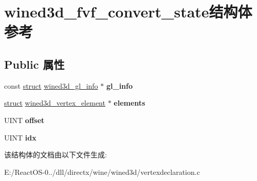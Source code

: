 \hypertarget{structwined3d__fvf__convert__state}{}\section{wined3d\+\_\+fvf\+\_\+convert\+\_\+state结构体 参考}
\label{structwined3d__fvf__convert__state}
\subsection*{Public 属性}
\begin{DoxyCompactItemize}
\item 
\mbox{\label{structwined3d__fvf__convert__state_a5e840e91ea45bf5d2d4d77de8e60e11f}} 
const \hyperlink{interfacestruct}{struct} \hyperlink{structwined3d__gl__info}{wined3d\+\_\+gl\+\_\+info} $\ast$ {\bfseries gl\+\_\+info}
\item 
\mbox{\label{structwined3d__fvf__convert__state_a74fcb92bd3f340d1e07d19ba9ffad237}} 
\hyperlink{interfacestruct}{struct} \hyperlink{structwined3d__vertex__element}{wined3d\+\_\+vertex\+\_\+element} $\ast$ {\bfseries elements}
\item 
\mbox{\label{structwined3d__fvf__convert__state_a5eeedc0400c02e8200c4e3b21b64fbc5}} 
U\+I\+NT {\bfseries offset}
\item 
\mbox{\label{structwined3d__fvf__convert__state_a9bc6e094f6934b99d6d428bc8a902038}} 
U\+I\+NT {\bfseries idx}
\end{DoxyCompactItemize}


该结构体的文档由以下文件生成\+:\begin{DoxyCompactItemize}
\item 
E\+:/\+React\+O\+S-\/0../dll/directx/wine/wined3d/vertexdeclaration.\+c\end{DoxyCompactItemize}
